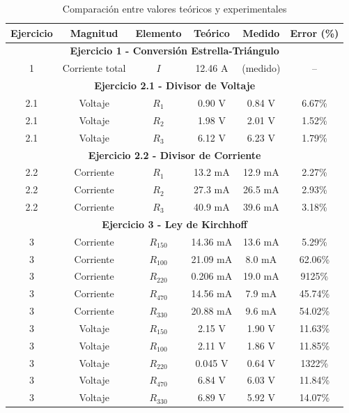 \documentclass[conference]{IEEEtran}
\begin{document}
\begin{table}[H]
  \centering
  \caption{Comparación entre valores teóricos y experimentales}
  \begin{tabular}{|c|c|c|c|c|c|}
    \hline
      \textbf{Ejercicio} & \textbf{Magnitud} & \textbf{Elemento} & \textbf{Teórico} & \textbf{Medido} & \textbf{Error (\%)} \\
    \hline
    \multicolumn{6}{|c|}{\textbf{Ejercicio 1 - Conversión Estrella-Triángulo}} \\
    \hline
      1 & Corriente total & $I$ & 12.46 A & (medido) & -- \\
    \hline
    \multicolumn{6}{|c|}{\textbf{Ejercicio 2.1 - Divisor de Voltaje}} \\
    \hline
      2.1 & Voltaje & $R_1$ & 0.90 V & 0.84 V & 6.67\% \\
      2.1 & Voltaje & $R_2$ & 1.98 V & 2.01 V & 1.52\% \\
      2.1 & Voltaje & $R_3$ & 6.12 V & 6.23 V & 1.79\% \\
    \hline
    \multicolumn{6}{|c|}{\textbf{Ejercicio 2.2 - Divisor de Corriente}} \\
    \hline
      2.2 & Corriente & $R_1$ & 13.2 mA & 12.9 mA & 2.27\% \\
      2.2 & Corriente & $R_2$ & 27.3 mA & 26.5 mA & 2.93\% \\
      2.2 & Corriente & $R_3$ & 40.9 mA & 39.6 mA & 3.18\% \\
    \hline
    \multicolumn{6}{|c|}{\textbf{Ejercicio 3 - Ley de Kirchhoff}} \\
    \hline
      3 & Corriente & $R_{150}$ & 14.36 mA & 13.6 mA & 5.29\% \\
      3 & Corriente & $R_{100}$ & 21.09 mA & 8.0 mA & 62.06\% \\
      3 & Corriente & $R_{220}$ & 0.206 mA & 19.0 mA & 9125\% \\
      3 & Corriente & $R_{470}$ & 14.56 mA & 7.9 mA & 45.74\% \\
      3 & Corriente & $R_{330}$ & 20.88 mA & 9.6 mA & 54.02\% \\
    \hline
      3 & Voltaje & $R_{150}$ & 2.15 V & 1.90 V & 11.63\% \\
      3 & Voltaje & $R_{100}$ & 2.11 V & 1.86 V & 11.85\% \\
      3 & Voltaje & $R_{220}$ & 0.045 V & 0.64 V & 1322\% \\
      3 & Voltaje & $R_{470}$ & 6.84 V & 6.03 V & 11.84\% \\
      3 & Voltaje & $R_{330}$ & 6.89 V & 5.92 V & 14.07\% \\
    \hline
  \end{tabular}
\end{table}
\end{document}
